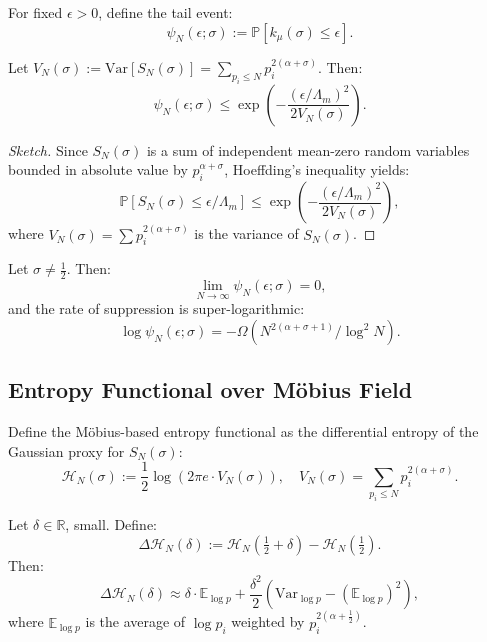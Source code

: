 \documentclass[12pt]{article}
\begin{document}
\begin{definition}
For fixed $\epsilon > 0$, define the tail event:
\[
\psi_N(\epsilon; \sigma) := \mathbb{P} \left[ k_\mu(\sigma) \le \epsilon \right].
\]
\end{definition}

\begin{lemma}
Let $V_N(\sigma) := \mathrm{Var}[S_N(\sigma)] = \sum_{p_i \le N} p_i^{2(\alpha + \sigma)}$. Then:
\[
\psi_N(\epsilon; \sigma) \le \exp \left( - \frac{(\epsilon / \Lambda_m)^2}{2 V_N(\sigma)} \right).
\]
\end{lemma}

\begin{proof}[Sketch]
Since $S_N(\sigma)$ is a sum of independent mean-zero random variables bounded in absolute value by $p_i^{\alpha + \sigma}$, Hoeffding's inequality yields:
\[
\mathbb{P}[S_N(\sigma) \le \epsilon / \Lambda_m] \le \exp \left( -\frac{(\epsilon / \Lambda_m)^2}{2 V_N(\sigma)} \right),
\]
where $V_N(\sigma) = \sum p_i^{2(\alpha + \sigma)}$ is the variance of $S_N(\sigma)$.
\end{proof}

\begin{corollary}
Let $\sigma \ne \tfrac{1}{2}$. Then:
\[
\lim_{N \to \infty} \psi_N(\epsilon; \sigma) = 0,
\]
and the rate of suppression is super-logarithmic:
\[
\log \psi_N(\epsilon; \sigma) = -\Omega(N^{2(\alpha + \sigma + 1)} / \log^2 N).
\]
\end{corollary}

\subsection*{Entropy Functional over Möbius Field}

Define the Möbius-based entropy functional as the differential entropy of the Gaussian proxy for $S_N(\sigma)$:
\[
\mathcal{H}_N(\sigma) := \frac{1}{2} \log \left( 2\pi e \cdot V_N(\sigma) \right), \quad V_N(\sigma) = \sum_{p_i \le N} p_i^{2(\alpha + \sigma)}.
\]

\begin{theorem}
Let $\delta \in \mathbb{R}$, small. Define:
\[
\Delta \mathcal{H}_N(\delta) := \mathcal{H}_N\left( \tfrac{1}{2} + \delta \right) - \mathcal{H}_N\left( \tfrac{1}{2} \right).
\]
Then:
\[
\Delta \mathcal{H}_N(\delta) \approx \delta \cdot \mathbb{E}_{\log p} + \frac{\delta^2}{2} \left( \mathrm{Var}_{\log p} - \left( \mathbb{E}_{\log p} \right)^2 \right),
\]
where $\mathbb{E}_{\log p}$ is the average of $\log p_i$ weighted by $p_i^{2(\alpha + \tfrac{1}{2})}$.
\end{theorem}
\end{document}
